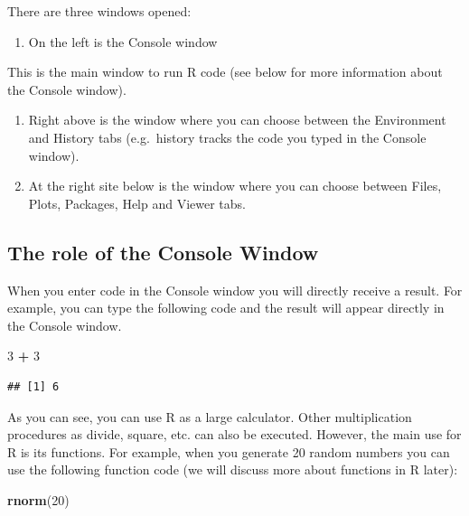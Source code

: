 \documentclass[]{book}
\newenvironment{Shaded}{\begin{snugshade}}{\end{snugshade}}
\newcommand{\KeywordTok}[1]{\textcolor[rgb]{0.13,0.29,0.53}{\textbf{#1}}}
\newcommand{\DecValTok}[1]{\textcolor[rgb]{0.00,0.00,0.81}{#1}}
\newcommand{\StringTok}[1]{\textcolor[rgb]{0.31,0.60,0.02}{#1}}
\newcommand{\OperatorTok}[1]{\textcolor[rgb]{0.81,0.36,0.00}{\textbf{#1}}}
\newcommand{\NormalTok}[1]{#1}
\providecommand{\tightlist}{%
  \setlength{\itemsep}{0pt}\setlength{\parskip}{0pt}}
\theoremstyle{definition}
\theoremstyle{definition}
\theoremstyle{definition}
\theoremstyle{remark}
\begin{document}
There are three windows opened:

\begin{enumerate}
\def\labelenumi{\arabic{enumi}.}
\tightlist
\item
  On the left is the Console window
\end{enumerate}

This is the main window to run R code (see below for more information
about the Console window).

\begin{enumerate}
\def\labelenumi{\arabic{enumi}.}
\setcounter{enumi}{1}
\tightlist
\item
  Right above is the window where you can choose between the Environment
  and History tabs (e.g.~history tracks the code you typed in the
  Console window).
\item
  At the right site below is the window where you can choose between
  Files, Plots, Packages, Help and Viewer tabs.
\end{enumerate}

\subsection{The role of the Console
Window}\label{the-role-of-the-console-window}

When you enter code in the Console window you will directly receive a
result. For example, you can type the following code and the result will
appear directly in the Console window.

\begin{Shaded}
\begin{Highlighting}[]
\DecValTok{3} \OperatorTok{+}\StringTok{ }\DecValTok{3}
\end{Highlighting}
\end{Shaded}

\begin{verbatim}
## [1] 6
\end{verbatim}

As you can see, you can use R as a large calculator. Other
multiplication procedures as divide, square, etc. can also be executed.
However, the main use for R is its functions. For example, when you
generate 20 random numbers you can use the following function code (we
will discuss more about functions in R later):

\begin{Shaded}
\begin{Highlighting}[]
\KeywordTok{rnorm}\NormalTok{(}\DecValTok{20}\NormalTok{)}
\end{Highlighting}
\end{Shaded}
\end{document}
